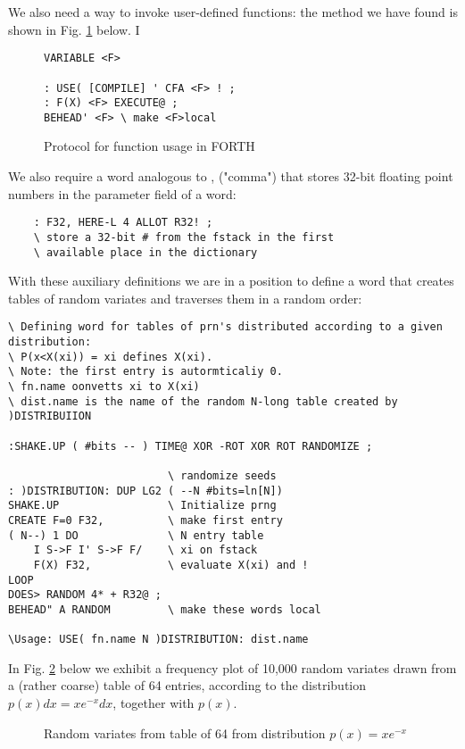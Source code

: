 We also need a way to invoke user-defined functions: the method
we have found is shown in Fig. \ref{fig:03_04} below. I

\begin{figure}
    \label{fig:03_04}
    \begin{mdframed}
        \begin{lstlisting}
VARIABLE <F>

: USE( [COMPILE] ' CFA <F> ! ;
: F(X) <F> EXECUTE@ ;
BEHEAD' <F> \ make <F>local
        \end{lstlisting}
    \end{mdframed}
    \caption{Protocol for function usage in FORTH
}
\end{figure}

We also require a word analogous to , ("comma") that stores
32-bit floating point numbers in the parameter field of a word:

\begin{verbatim}
    : F32, HERE-L 4 ALLOT R32! ;
    \ store a 32-bit # from the fstack in the first
    \ available place in the dictionary
\end{verbatim}

With these auxiliary definitions we are in a position to define a
word that creates tables of random variates and traverses them in a random order:

\begin{verbatim}
\ Defining word for tables of prn's distributed according to a given distribution:
\ P(x<X(xi)) = xi defines X(xi).
\ Note: the first entry is autormticaliy 0.  
\ fn.name oonvetts xi to X(xi) 
\ dist.name is the name of the random N-long table created by )DISTRIBUIION

:SHAKE.UP ( #bits -- ) TIME@ XOR -ROT XOR ROT RANDOMIZE ;

                         \ randomize seeds
: )DISTRIBUTION: DUP LG2 ( --N #bits=ln[N])
SHAKE.UP                 \ Initialize prng
CREATE F=0 F32,          \ make first entry
( N--) 1 DO              \ N entry table
    I S->F I' S->F F/    \ xi on fstack
    F(X) F32,            \ evaluate X(xi) and !
LOOP
DOES> RANDOM 4* + R32@ ;
BEHEAD" A RANDOM         \ make these words local

\Usage: USE( fn.name N )DISTRIBUTION: dist.name
\end{verbatim}
In Fig. \ref{fig:03_05} below we exhibit a frequency plot of 10,000 random
variates drawn from a (rather coarse) table of 64 entries, according to the
distribution $p(x)dx=xe^{-x}dx$, together with $p(x)$.
\begin{figure}
    \caption{Random variates from table of 64 from distribution $p(x)=xe^{-x}$}
    \label{fig:03_05}
\end{figure}

